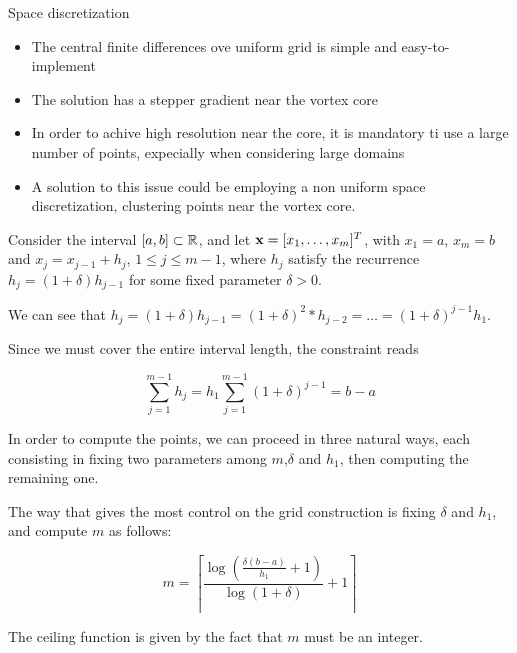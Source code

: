 \begin{frame}[allowframebreaks]{Space discretization}
\begin{itemize}
    \item The central finite differences ove uniform grid is simple and easy-to-implement
    \item The solution has a stepper gradient near the vortex core
    \item In order to achive high resolution near the core, it is mandatory ti use a large number of points, expecially when considering large domains
    \item A solution to this issue could be employing a non uniform space discretization, clustering points near the vortex core.
\end{itemize}

Consider the interval $[a,b] \subset \mathbb{R}$, and let $\mathbf{x} = [x_1, \dots, x_m]^T$, with $x_1 = a$, $x_m = b$ and $x_j = x_{j-1} + h_j$, $1 \leq j \leq m-1$, where $h_j$ satisfy the recurrence $h_j = (1 + \delta)h_{j-1}$ for some fixed parameter $\delta > 0$.

We can see that $h_j = (1 + \delta)h_{j-1} = (1 + \delta)^2*h_{j-2} = \dots = (1 + \delta)^{j-1}h_1$.

Since we must cover the entire interval length, the constraint reads

\begin{equation*}
    \sum_{j = 1}^{m-1} h_j = h_1\sum_{j = 1}^{m-1}(1 + \delta)^{j-1} = b - a
\end{equation*}

In order to compute the points, we can proceed in three natural ways, each consisting in fixing two parameters among $m$,$\delta$ and $h_1$, then computing the remaining one. 

The way that gives the most control on the grid construction is fixing $\delta$ and $h_1$, and compute $m$ as follows:

\begin{equation*}
    m = \left\lceil \frac{\log\!\left(\tfrac{\delta(b-a)}{h_1} + 1\right)}{\log(1+\delta)} + 1 \right\rceil
\end{equation*}

The ceiling function is given by the fact that $m$ must be an integer.

\end{frame}
